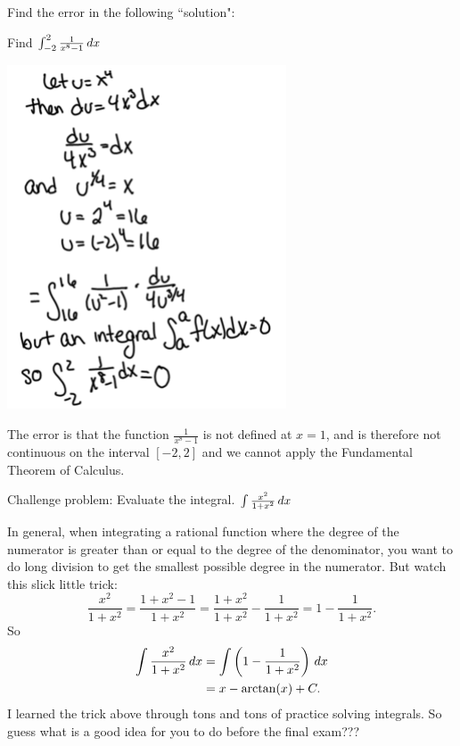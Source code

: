 \documentclass[nooutcomes]{ximera}
\begin{document}
\begin{problem}
Find the error in the following ``solution":

Find $\int_{-2}^2 \frac{1}{x^8 - 1} \,d x$

	\begin{image}
	\includegraphics[scale=.6]{Images/Figure1.png}
	\end{image}

	\begin{freeResponse}
	The error is that the function $\frac{1}{x^8-1}$ is not defined at $x=1$, and is therefore not continuous on the interval $[-2,2]$ and we cannot apply the Fundamental Theorem of Calculus.
	\end{freeResponse}
\end{problem}

\begin{problem}
Challenge problem: Evaluate the integral.
  $\int \frac{x^2 }{1 + x^2} \,d x$
  \begin{freeResponse}
    In general, when integrating a rational function where the degree of the numerator is greater than or equal to the degree of the denominator, you want to do long division to get the smallest possible degree in the numerator.
    But watch this slick little trick:
    \begin{equation*}
      \frac{x^2}{1+x^2} = \frac{1 + x^2 - 1}{1+x^2} = \frac{1+x^2}{1+x^2} - \frac{1}{1+x^2} = 1 - \frac{1}{1+x^2}.
    \end{equation*}
    So
    \begin{align*}
      \int \frac{x^2 }{1 + x^2} \,d x &= \int \left( 1 - \frac{1}{1+x^2} \right) \,d x  \\                                     &= x - \arctan(x) + C.
    \end{align*}
    I learned the trick above through tons and tons of practice solving integrals.
    So guess what is a good idea for you to do before the final exam???
  \end{freeResponse}
\end{problem}
\end{document}
